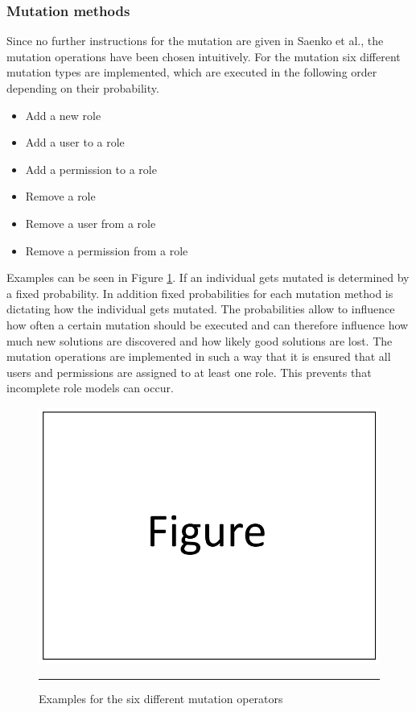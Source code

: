         \subsubsection{Mutation methods}
        Since no further instructions for the mutation are given in Saenko et al.\cite{saenko2012design}, the mutation operations have been chosen intuitively. For the mutation six different mutation types are implemented, which are executed in the following order depending on their probability.
        \begin{itemize}
            \setlength{\itemsep}{1pt}
            \item Add a new role
            \item Add a user to a role
            \item Add a permission to a role
            \item Remove a role
            \item Remove a user from a role
            \item Remove a permission from a role
        \end{itemize}
        Examples can be seen in Figure \ref{fig:mutationOperations}. If an individual gets mutated is determined by a fixed probability. In addition fixed probabilities for each mutation method is dictating how the individual gets mutated. The probabilities allow to influence how often a certain mutation should be executed and can therefore influence how much new solutions are discovered and how likely good solutions are lost. The mutation operations are implemented in such a way that it is ensured that all users and permissions are assigned to at least one role. This prevents that incomplete role models can occur.
        \begin{figure}
            \centering
            \includegraphics[scale=0.4]{./Figures/dummy.png}
            \rule{20em}{0.5pt}
            \caption{Examples for the six different mutation operators}
            \label{fig:mutationOperations}
        \end{figure}
